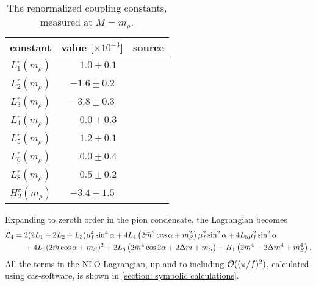 \begin{table}
    \centering
    \def\arraystretch{1.2}
    \caption{The renormalized coupling constants, measured at $M = m_\rho$.}
    \label{table: coupling constants}
    \begin{tabular}{c c c}
        \hline \hline
        constant & value [$\times 10^{-3}$] & source \\
        \hline
        $L_1^r(m_\rho)$ & $\phantom{-}1.0 \pm 0.1 $ & \autocite{bijnensMesonicLowEnergyConstants2014} \\
        $L_2^r(m_\rho)$ & $-1.6 \pm 0.2 $ & \autocite{bijnensMesonicLowEnergyConstants2014} \\
        $L_3^r(m_\rho)$ & $-3.8 \pm 0.3 $ & \autocite{bijnensMesonicLowEnergyConstants2014} \\
        $L_4^r(m_\rho)$ & $\phantom{-}0.0 \pm 0.3 $ & \autocite{bijnensMesonicLowEnergyConstants2014} \\
        $L_5^r(m_\rho)$ & $\phantom{-}1.2 \pm 0.1 $ & \autocite{bijnensMesonicLowEnergyConstants2014} \\
        $L_6^r(m_\rho)$ & $\phantom{-}0.0 \pm 0.4 $ & \autocite{bijnensMesonicLowEnergyConstants2014} \\
        $L_8^r(m_\rho)$ & $\phantom{-}0.5 \pm 0.2 $ & \autocite{bijnensMesonicLowEnergyConstants2014} \\
        $H_2^r(m_\rho)$ & $-3.4 \pm 1.5 $ & \autocite{jaminFlavoursymmetryBreakingQuark2002} 
    \end{tabular}
\end{table}


Expanding to zeroth order in the pion condensate, the Lagrangian  becomes
%
\begin{align}
    \nonumber
    \mathcal{L}_4
    = {}&
    2(2L_1 + 2L_2 + L_3) \mu_I^4 \sin^4\alpha
    + 4  L_4 \left( 2 \bar m^2 \cos\alpha + m_S^2 \right) \mu_I^2\sin^2\alpha
    + 4 L_5 \mu_I^2\sin^2 \alpha 
    \\ & 
    + 4 L_6 (2\bar m\cos\alpha + m_S)^2
    + 2 L_8 \left(2 \bar m^4 \cos2\alpha + 2 \Delta m + m_S\right)
    + H_1 \left(2\bar m^4 + 2\Delta m^4 + m_S^4 \right).
\end{align}
%
All the terms in the NLO Lagrangian, up and to including  $\mathcal O((\pi/f)^2)$, calculated using cas-software, is shown in \autoref{section: symbolic calculations}.




